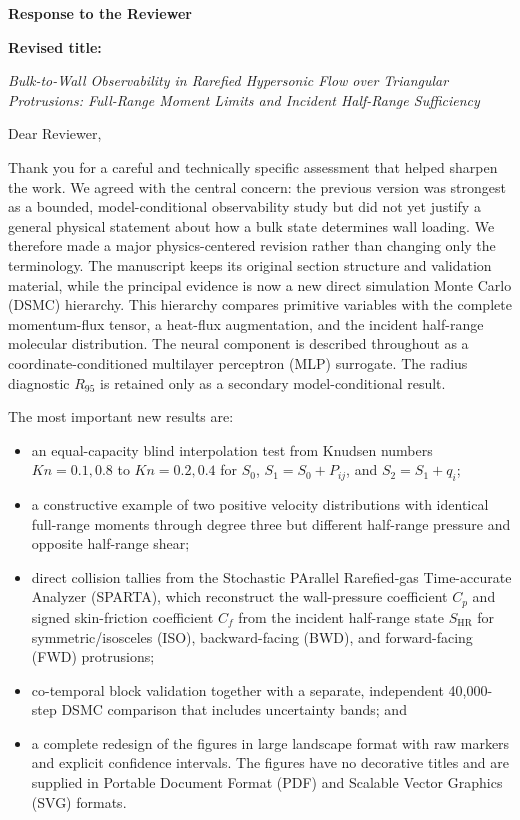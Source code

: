 \documentclass[11pt]{article}
\begin{document}
\begin{center}
{\Large\bfseries Response to the Reviewer}\par\vspace{0.6em}
{\bfseries Revised title:}\par
\emph{Bulk-to-Wall Observability in Rarefied Hypersonic Flow over Triangular Protrusions: Full-Range Moment Limits and Incident Half-Range Sufficiency}
\end{center}

Dear Reviewer,

Thank you for a careful and technically specific assessment that helped sharpen the work. We agreed with the central concern: the previous version was strongest as a bounded, model-conditional observability study but did not yet justify a general physical statement about how a bulk state determines wall loading. We therefore made a major physics-centered revision rather than changing only the terminology. The manuscript keeps its original section structure and validation material, while the principal evidence is now a new direct simulation Monte Carlo (DSMC) hierarchy. This hierarchy compares primitive variables with the complete momentum-flux tensor, a heat-flux augmentation, and the incident half-range molecular distribution. The neural component is described throughout as a coordinate-conditioned multilayer perceptron (MLP) surrogate. The radius diagnostic $R_{95}$ is retained only as a secondary model-conditional result.

The most important new results are:
\begin{itemize}[leftmargin=1.5em]
\item an equal-capacity blind interpolation test from Knudsen numbers $Kn=0.1,0.8$ to $Kn=0.2,0.4$ for $S_0$, $S_1=S_0+P_{ij}$, and $S_2=S_1+q_i$;
\item a constructive example of two positive velocity distributions with identical full-range moments through degree three but different half-range pressure and opposite half-range shear;
\item direct collision tallies from the Stochastic PArallel Rarefied-gas Time-accurate Analyzer (SPARTA), which reconstruct the wall-pressure coefficient $C_p$ and signed skin-friction coefficient $C_f$ from the incident half-range state $S_{\mathrm{HR}}$ for symmetric/isosceles (ISO), backward-facing (BWD), and forward-facing (FWD) protrusions;
\item co-temporal block validation together with a separate, independent 40,000-step DSMC comparison that includes uncertainty bands; and
\item a complete redesign of the figures in large landscape format with raw markers and explicit confidence intervals. The figures have no decorative titles and are supplied in Portable Document Format (PDF) and Scalable Vector Graphics (SVG) formats.
\end{itemize}
\end{document}
